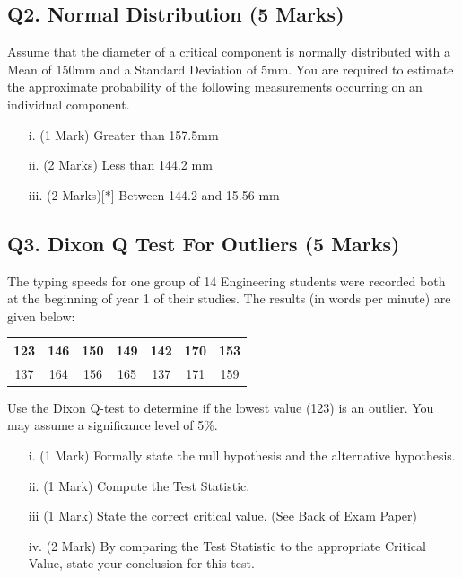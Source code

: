 \documentclass[a4paper,12pt]{article}
\begin{document}
\subsection*{Q2. Normal Distribution (5 Marks)} %
Assume that the diameter of a critical component is normally distributed with a Mean of 150mm and a Standard Deviation of 5mm. You are required  to estimate the approximate probability of the following measurements occurring on an individual component.
\begin{itemize}
	\item [i.](1 Mark)	Greater than 157.5mm
	\item [ii.](2 Marks) Less than 144.2 mm
	\item [iii.](2 Marks)[$\ast$] Between 144.2 and 15.56 mm
\end{itemize}
\bigskip


\subsection*{Q3. Dixon Q Test For Outliers (5 Marks)}

The typing speeds for one group of 14 Engineering students were recorded both at the beginning of year 1 of their studies. The results (in words per minute) are given below:

\begin{center}
	\begin{tabular}{|c|c|c|c|c|c|c|}
		\hline
		123 & 146 & 150 &149 &142 &170& 153\\ \hline
		137 & 164 & 156& 165& 137& 171& 159
		\\ \hline
	\end{tabular}
\end{center}
Use the Dixon Q-test to determine if the lowest value (123) is an outlier. You may assume a significance level of 5\%.

\begin{itemize}
	\item[i.] (1 Mark) Formally state the null hypothesis and the alternative hypothesis.
	\item[ii.] (1 Mark) Compute the Test Statistic.
	\item[iii] (1 Mark) State the correct critical value. (See Back of Exam Paper)
	\item[iv.] (2 Mark) By comparing the Test Statistic to the appropriate Critical Value, state your conclusion for this test.
\end{itemize}
\newpage
\end{document}
